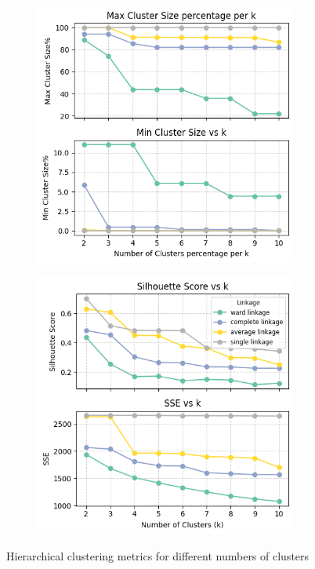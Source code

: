 \begin{figure}[H]
    \centering
    \begin{subfigure}[t]{0.49\textwidth}
        \centering
        \includegraphics[width=0.95\textwidth]{plots/max_min_pctg.png}
        \label{fig:max_min_pctg}
    \end{subfigure}
    \hfill
    \begin{subfigure}[t]{0.49\textwidth}
        \centering
        \includegraphics[width=0.95\textwidth]{plots/sil_sse_hierarchical_clust.png}
        \label{fig:sil_sse_hierarchical_clust}
    \end{subfigure}
    \caption{Hierarchical clustering metrics for different numbers of clusters}
    \label{fig:hier_clust_stats}
\end{figure}


